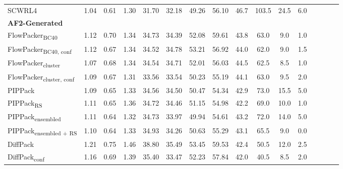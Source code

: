 \begin{table}
{\begin{tabular}{@{}lccccccccccccccc@{}}
                \textnormal{\hspace{0.5cm}SCWRL4} & 1.04 & 0.61 & 1.30 & 31.70 & 32.18 & 49.26 & 56.10 & 46.7 & 103.5 & 24.5 & 6.0 \\
            \textbf{AF2-Generated} & & & & & & & & & \\ 
                \textnormal{\hspace{0.5cm}FlowPacker\textsubscript{BC40}} & 1.12 & 0.70 & 1.34 & 34.73 & 34.39 & 52.08 & 59.61 & 43.8 & 63.0 & 9.0 & 1.0 \\
                \textnormal{\hspace{0.5cm}FlowPacker\textsubscript{BC40, conf}} & 1.12 & 0.67 & 1.34 & 34.52 & 34.78 & 53.21 & 56.92 & 44.0 & 62.0 & 9.0 & 1.5 \\
                \textnormal{\hspace{0.5cm}FlowPacker\textsubscript{cluster}} & 1.07 & 0.68 & 1.34 & 34.54 & 34.71 & 52.01 & 56.03 & 44.5 & 62.5 & 8.5 & 1.0 \\
                \textnormal{\hspace{0.5cm}FlowPacker\textsubscript{cluster, conf}} & 1.09 & 0.67 & 1.31 & 33.56 & 33.54 & 50.23 & 55.19 & 44.1 & 63.0 & 9.5 & 2.0 \\
                \textnormal{\hspace{0.5cm}PIPPack} & 1.09 & 0.65 & 1.33 & 34.56 & 34.50 & 50.47 & 54.34 & 42.9 & 73.0 & 15.5 & 5.0 \\
                \textnormal{\hspace{0.5cm}PIPPack\textsubscript{RS}} & 1.11 & 0.65 & 1.36 & 34.72 & 34.46 & 51.15 & 54.98 & 42.2 & 69.0 & 10.0 & 1.0 \\
                \textnormal{\hspace{0.5cm}PIPPack\textsubscript{ensembled}} & 1.11 & 0.64 & 1.32 & 34.73 & 33.97 & 49.94 & 54.61 & 43.2 & 72.0 & 14.0 & 5.0 \\
                \textnormal{\hspace{0.5cm}PIPPack\textsubscript{ensembled + RS}} & 1.10 & 0.64 & 1.33 & 34.93 & 34.26 & 50.63 & 55.29 & 43.1 & 65.5 & 9.0 & 0.0 \\
                \textnormal{\hspace{0.5cm}DiffPack} & 1.21 & 0.75 & 1.46 & 38.80 & 35.49 & 53.45 & 59.53 & 42.4 & 50.5 & 12.0 & 2.5 \\
                \textnormal{\hspace{0.5cm}DiffPack\textsubscript{conf}} & 1.16 & 0.69 & 1.39 & 35.40 & 33.47 & 52.23 & 57.84 & 42.0 & 40.5 & 8.5 & 2.0 \\

\end{tabular}}
\end{table}
